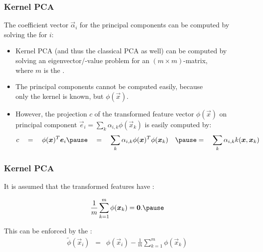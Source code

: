 \begin{frame}
	\frametitle{Kernel PCA \cont}

	The coefficient vector $\vec \alpha_i$ for the principal components can be computed by solving the  for $i$: \\[.25cm]

	\begin{center}
	\end{center}
	\pause


	\small
	\begin{itemize}
		\item Kernel PCA (and thus the classical PCA as well) can be computed by \\
		      solving an eigenvector/-value problem for an $(m\times m)$-matrix, \\
		      where $m$ is the . \pause
		\item The principal components cannot be computed easily, because \\
		      only the kernel is known, but  $\phi(\vec x)$.  \pause
		\item However, the projection $c$ of the transformed feature vector $\phi(\vec x)$ on \\
		      principal component $\vec e_i= \sum_{k} \alpha_{i,k}  \phi(\vec x_k)$ is easily computed by:
		      \begin{displaymath}
			      c \quad = \quad
			      \phi( \vec x)^T \vec e_i \pause \quad = \quad
			      \sum_{k} \alpha_{i,k} \phi(\vec x)^T\phi(\vec x_k) \quad \pause = \quad
			      \sum_{k} \alpha_{i,k} k(\vec x, \vec x_k)
		      \end{displaymath}
	\end{itemize}
\end{frame}


\begin{frame}
	\frametitle{Kernel PCA \cont}

	It is assumed that the transformed features have :

	\begin{displaymath}
		\frac{1}{m}\sum_{k=1}^m \phi(\vec x_k) = \vec 0. \pause
	\end{displaymath}

	This can be enforced by the :
	\begin{eqnarray*}
		\tilde\phi(\vec x_i) &=& \phi(\vec x_i) - \frac{1}{m}\sum_{k=1}^m \phi(\vec x_k)
	\end{eqnarray*}
\end{frame}


